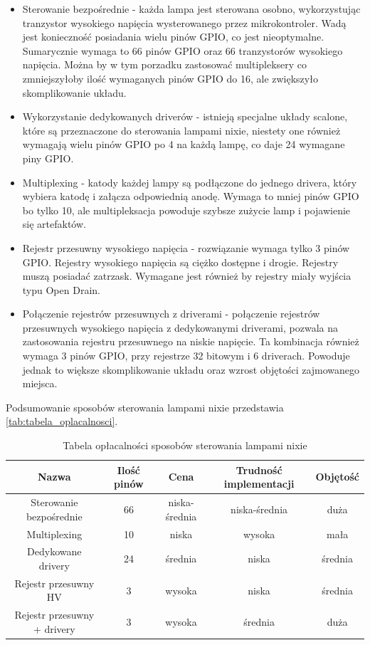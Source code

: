 \documentclass[../main.tex]{subfiles}
\begin{document}
\begin{itemize}
    \item Sterowanie bezpośrednie - każda lampa jest sterowana osobno, wykorzystując tranzystor wysokiego napięcia wysterowanego przez mikrokontroler.
    Wadą jest konieczność posiadania wielu pinów GPIO, co jest nieoptymalne. Sumarycznie wymaga to 66 pinów GPIO oraz 66 tranzystorów wysokiego napięcia.
    Można by w tym porzadku zastosować multipleksery co zmniejszyłoby ilość wymaganych pinów GPIO do 16, ale zwiększyło skomplikowanie układu.
    \item Wykorzystanie dedykowanych driverów - istnieją specjalne układy scalone, które są przeznaczone do sterowania lampami nixie, niestety
    one również wymagają wielu pinów GPIO po 4 na każdą lampę, co daje 24 wymagane piny GPIO.
    \item Multiplexing - katody każdej lampy są podłączone do jednego drivera, który wybiera katodę i załącza odpowiednią anodę. 
    Wymaga to mniej pinów GPIO bo tylko 10, ale multipleksacja powoduje szybsze zużycie lamp i pojawienie się artefaktów.
    \item Rejestr przesuwny wysokiego napięcia - rozwiązanie wymaga tylko 3 pinów GPIO. Rejestry wysokiego napięcia są ciężko dostępne i drogie.
    Rejestry muszą posiadać zatrzask. Wymagane jest również by rejestry miały wyjścia typu Open Drain.
    \item Połączenie rejestrów przesuwnych z driverami - połączenie rejestrów przesuwnych wysokiego napięcia z dedykowanymi driverami, pozwala na zastosowania
    rejestru przesuwnego na niskie napięcie. Ta kombinacja również wymaga 3 pinów GPIO, przy rejestrze 32 bitowym i 6 driverach. Powoduje jednak to
    większe skomplikowanie układu oraz wzrost objętości zajmowanego miejsca.
\end{itemize}
Podsumowanie sposobów sterowania lampami nixie przedstawia \ref{tab:tabela_oplacalnosci}.
\begin{table}[H]
  \centering
  \begin{tabular}{|c|c|c|c|c|}
    \hline
    Nazwa & Ilość pinów & Cena & Trudność implementacji & Objętość\\
    \hline
    Sterowanie bezpośrednie & 66 & niska-średnia & niska-średnia & duża \\
    \hline
    Multiplexing & 10 &niska & wysoka & mała \\
    \hline
    Dedykowane drivery & 24 &średnia & niska & średnia \\
    \hline
    Rejestr przesuwny HV & 3 &wysoka & niska & średnia \\
    \hline
    Rejestr przesuwny + drivery & 3 & wysoka & średnia & duża \\
    \hline
  \end{tabular}
  \caption{Tabela opłacalności sposobów sterowania lampami nixie}
\end{table}
\end{document}
